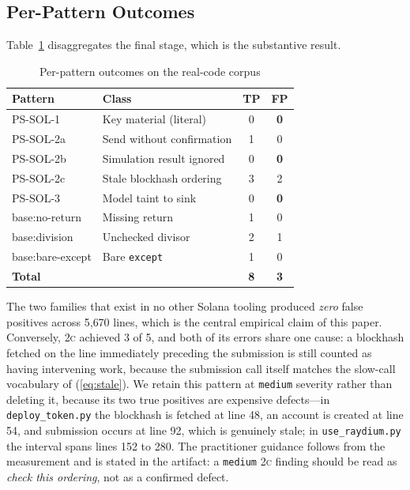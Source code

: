 \subsection{Per-Pattern Outcomes}

Table~\ref{tab:pattern} disaggregates the final stage, which is the
substantive result.

\begin{table}[t]
\caption{Per-pattern outcomes on the real-code corpus}
\label{tab:pattern}
\centering
\begin{tabular}{@{}llcc@{}}
\toprule
\textbf{Pattern} & \textbf{Class} & \textbf{TP} & \textbf{FP} \\
\midrule
PS-SOL-1 & Key material (literal)      & 0 & \textbf{0} \\
PS-SOL-2a & Send without confirmation   & 1 & 0 \\
PS-SOL-2b & Simulation result ignored   & 0 & \textbf{0} \\
PS-SOL-2c & Stale blockhash ordering    & 3 & 2 \\
PS-SOL-3 & Model taint to sink         & 0 & \textbf{0} \\
\midrule
base:no-return    & Missing return        & 1 & 0 \\
base:division     & Unchecked divisor     & 2 & 1 \\
base:bare-except  & Bare \texttt{except}  & 1 & 0 \\
\midrule
\textbf{Total}    &                       & \textbf{8} & \textbf{3} \\
\bottomrule
\end{tabular}
\end{table}

The two families that exist in no other Solana tooling produced
\emph{zero} false positives across 5{,}670 lines, which is the central
empirical claim of this paper. Conversely, \textsc{2c} achieved 3 of 5, and
both of its errors share one cause: a blockhash fetched on the line
immediately preceding the submission is still counted as having intervening
work, because the submission call itself matches the slow-call vocabulary of
(\ref{eq:stale}). We retain this pattern at \texttt{medium} severity rather
than deleting it, because its two true positives are expensive defects---in
\texttt{deploy\_token.py} the blockhash is fetched at line 48, an account is
created at line 54, and submission occurs at line 92, which is genuinely
stale; in \texttt{use\_raydium.py} the interval spans lines 152 to 280. The
practitioner guidance follows from the measurement and is stated in the
artifact: a \texttt{medium} \textsc{2c} finding should be read as \emph{check
this ordering}, not as a confirmed defect.

